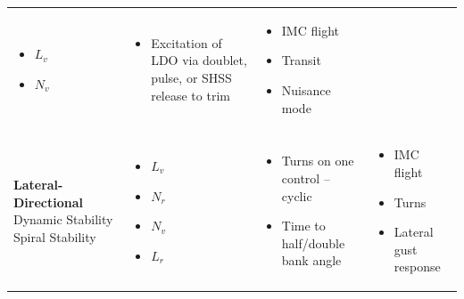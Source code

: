 \documentclass[
]{book}
\providecommand{\tightlist}{%
  \setlength{\itemsep}{0pt}\setlength{\parskip}{0pt}}
\begin{document}
\begin{longtable}[]{@{}llll@{}}
\begin{minipage}[t]{0.14\columnwidth}
\begin{itemize}
\tightlist
\item
  \(L_v\)
\item
  \(N_v\)
\end{itemize}\strut
\end{minipage} & \begin{minipage}[t]{0.27\columnwidth}\raggedright
\begin{itemize}
\tightlist
\item
  Excitation of LDO via doublet, pulse,
  or SHSS release to trim
\end{itemize}\strut
\end{minipage} & \begin{minipage}[t]{0.33\columnwidth}\raggedright
\begin{itemize}
\tightlist
\item
  IMC flight
\item
  Transit
\item
  Nuisance mode
\end{itemize}\strut
\end{minipage}\tabularnewline
\begin{minipage}[t]{0.16\columnwidth}\raggedright
\textbf{Lateral-Directional}
Dynamic Stability
Spiral Stability\strut
\end{minipage} & \begin{minipage}[t]{0.14\columnwidth}\raggedright
\begin{itemize}
\tightlist
\item
  \(L_v\)
\item
  \(N_r\)
\item
  \(N_v\)
\item
  \(L_r\)
\end{itemize}\strut
\end{minipage} & \begin{minipage}[t]{0.27\columnwidth}\raggedright
\begin{itemize}
\tightlist
\item
  Turns on one control -- cyclic
\item
  Time to half/double bank angle
\end{itemize}\strut
\end{minipage} & \begin{minipage}[t]{0.33\columnwidth}\raggedright
\begin{itemize}
\tightlist
\item
  IMC flight
\item
  Turns
\item
  Lateral gust response
\end{itemize}\strut
\end{minipage}\tabularnewline
\bottomrule
\end{longtable}
\end{document}
